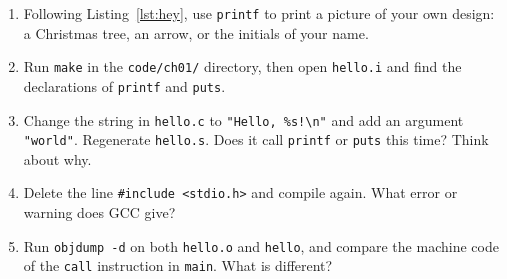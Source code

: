 
\begin{enumerate}
  \item Following Listing~\ref{lst:hey}, use \texttt{printf} to print a picture of your own design: a Christmas tree, an arrow, or the initials of your name.
  \item Run \texttt{make} in the \texttt{code/ch01/} directory, then open \texttt{hello.i} and find the declarations of \texttt{printf} and \texttt{puts}.
  \item Change the string in \texttt{hello.c} to \texttt{"Hello, \%s!\textbackslash n"} and add an argument \texttt{"world"}. Regenerate \texttt{hello.s}. Does it call \texttt{printf} or \texttt{puts} this time? Think about why.
  \item Delete the line \texttt{\#include <stdio.h>} and compile again. What error or warning does GCC give?
  \item Run \texttt{objdump -d} on both \texttt{hello.o} and \texttt{hello}, and compare the machine code of the \texttt{call} instruction in \texttt{main}. What is different?
\end{enumerate}
